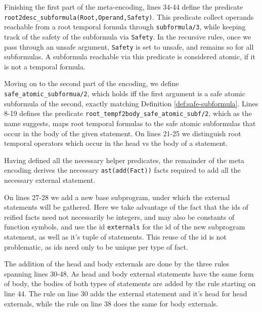 Finishing the first part of the meta-encoding, lines 34-44 define the
predicate \verb|root2desc_subformula(Root,Operand,Safety)|. This
predicate collect operands reachable from a root temporal formula
through \verb|subformula/3|, while keeping track of the safety of the
subformula via \verb|Safety|. In the recursive rules, once we pass
through an unsafe argument, \verb|Safety| is set to unsafe, and
remains so for all subformulas. A subformula reachable via this
predicate is considered atomic, if it is not a temporal formula.

Moving on to the second part of the encoding, we define
\texttt{safe\_atomic\_subformua/2}, which holds iff the first argument
is a safe atomic subformula of the second, exactly matching Definition
\ref{def:safe-subformula}. Lines 8-19 defines the predicate
\texttt{root\_tempf2body\_safe\_atomic\_subf/2}, which as the name
suggests, maps root temporal formulas to the safe atomic subformulas
that occur in the body of the given statement. On lines 21-25 we
distinguish root temporal operators which occur in the head vs the
body of a statement.

Having defined all the necessary helper predicates, the remainder of
the meta encoding derives the necessary \texttt{ast(add(Fact))} facts
required to add all the necessary external statement.

On lines 27-28 we add a new base subprogram, under which the external
statements will be gathered. Here we take advantage of the fact that
the ids of reified facts need not necessarily be integers, and may
also be constants of function symbols, and use the id
\texttt{externals} for the id of the new subprogram statement, as well
as it's tuple of statements. This reuse of the id is not problematic,
as ids need only to be unique per type of fact.

The addition of the head and body externals are done by the three
rules spanning lines 30-48. As head and body external statements have
the same form of body, the bodies of both types of statements are
added by the rule starting on line 44. The rule on line 30 adds the
external statement and it's head for head externals, while the rule on
line 38 does the same for body externals.

